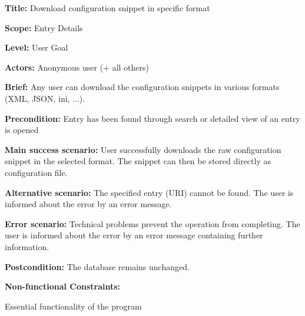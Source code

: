 
\begin{DoxyItemize}
\item {\bfseries{Title\+:}} Download configuration snippet in specific format
\item {\bfseries{Scope\+:}} Entry Details
\item {\bfseries{Level\+:}} User Goal
\item {\bfseries{Actors\+:}} Anonymous user (+ all others)
\item {\bfseries{Brief\+:}} Any user can download the configuration snippets in various formats (X\+ML, J\+S\+ON, ini, ...).
\end{DoxyItemize}


\begin{DoxyItemize}
\item {\bfseries{Precondition\+:}} Entry has been found through search or detailed view of an entry is opened
\item {\bfseries{Main success scenario\+:}} User successfully downloads the raw configuration snippet in the selected format. The snippet can then be stored directly as configuration file.
\item {\bfseries{Alternative scenario\+:}} The specified entry (U\+RI) cannot be found. The user is informed about the error by an error message.
\item {\bfseries{Error scenario\+:}} Technical problems prevent the operation from completing. The user is informed about the error by an error message containing further information.
\item {\bfseries{Postcondition\+:}} The database remains unchanged.
\item {\bfseries{Non-\/functional Constraints\+:}}
\begin{DoxyItemize}
\item Essential functionality of the program 
\end{DoxyItemize}
\end{DoxyItemize}